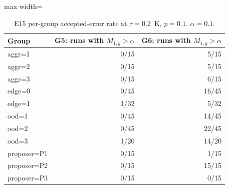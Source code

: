 \begin{table}[t]\centering\small
\begin{adjustbox}{max width=\linewidth}\begin{tabular}{lrr}
\hline
Group & G5: runs with $M_{1,g}>\alpha$ & G6: runs with $M_{1,g}>\alpha$ \\
\hline
aggr=1 & 0/15 & 5/15 \\
aggr=2 & 0/15 & 5/15 \\
aggr=3 & 0/15 & 6/15 \\
edge=0 & 0/45 & 16/45 \\
edge=1 & 1/32 & 5/32 \\
ood=1 & 0/45 & 14/45 \\
ood=2 & 0/45 & 22/45 \\
ood=3 & 1/20 & 14/20 \\
proposer=P1 & 0/15 & 1/15 \\
proposer=P2 & 0/15 & 15/15 \\
proposer=P3 & 0/15 & 0/15 \\
\hline
\end{tabular}\end{adjustbox}
\caption{E15 per-group accepted-error rate at $\tau = 0.2$~K, $p = 0.1$. $\alpha = 0.1$.}
\label{tab:e15-tau02}
\end{table}

